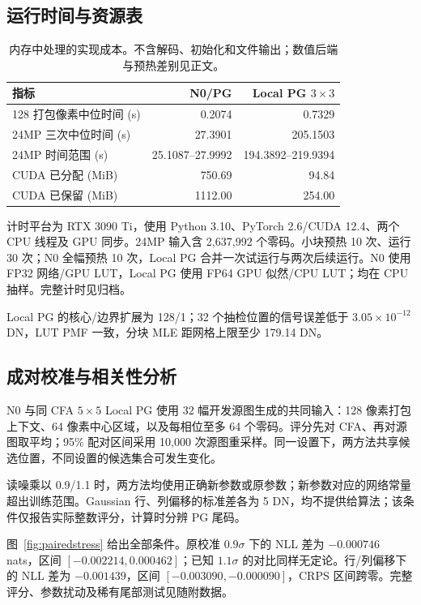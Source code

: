\documentclass[10pt,twocolumn,journal]{IEEEtran}
\begin{document}
\subsection{运行时间与资源表}
\begin{table}[tbp]
\centering
\caption{内存中处理的实现成本。不含解码、初始化和文件输出；数值后端与预热差别见正文。}
\label{tab:runtime}
\footnotesize\setlength{\tabcolsep}{4pt}
\begin{tabular}{@{}lrr@{}}
\toprule
指标 & N0/PG & Local PG $3\times3$\\
\midrule
128 打包像素中位时间 (s) & 0.2074 & 0.7329\\
24MP 三次中位时间 (s) & 27.3901 & 205.1503\\
24MP 时间范围 (s) & 25.1087--27.9992 & 194.3892--219.9394\\
CUDA 已分配 (MiB) & 750.69 & 94.84\\
CUDA 已保留 (MiB) & 1112.00 & 254.00\\
\bottomrule
\end{tabular}
\end{table}

计时平台为 RTX 3090 Ti，使用 Python 3.10、PyTorch 2.6/CUDA 12.4、两个 CPU 线程及 GPU 同步。24MP 输入含 2,637,992 个零码。小块预热 10 次、运行 30 次；N0 全幅预热 10 次，Local PG 合并一次试运行与两次后续运行。N0 使用 FP32 网络/GPU LUT，Local PG 使用 FP64 GPU 似然/CPU LUT；均在 CPU 抽样。完整计时见归档。

Local PG 的核心/边界扩展为 128/1；32 个抽检位置的信号误差低于 $3.05\times10^{-12}$ DN，LUT PMF 一致，分块 MLE 距网格上限至少 179.14 DN。

\subsection{成对校准与相关性分析}
N0 与同 CFA $5\times5$ Local PG 使用 32 幅开发源图生成的共同输入：128 像素打包上下文、64 像素中心区域，以及每相位至多 64 个零码。评分先对 CFA、再对源图取平均；95\% 配对区间采用 10,000 次源图重采样。同一设置下，两方法共享候选位置，不同设置的候选集合可发生变化。

读噪乘以 0.9/1.1 时，两方法均使用正确新参数或原参数；新参数对应的网络常量超出训练范围。Gaussian 行、列偏移的标准差各为 5 DN，均不提供给算法；该条件仅报告实际整数评分，计算时分辨 PG 尾码。

图~\ref{fig:pairedstress} 给出全部条件。原校准 $0.9\sigma$ 下的 NLL 差为 $-0.000746$ nats，区间 $[-0.002214,0.000462]$；已知 $1.1\sigma$ 的对比同样无定论。行/列偏移下的 NLL 差为 $-0.001439$，区间 $[-0.003090,-0.000090]$，CRPS 区间跨零。完整评分、参数扰动及稀有尾部测试见随附数据。
\end{document}
